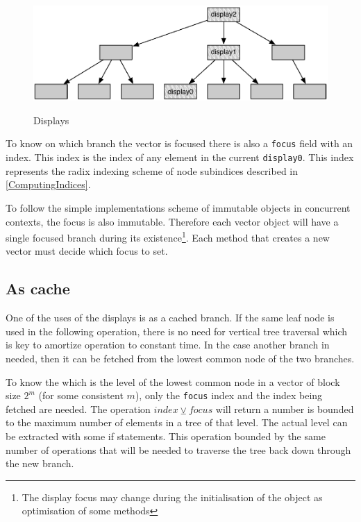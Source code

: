 \begin{figure}[h!]
  \centering
  \includegraphics[width=\textwidth]{Figures/Displays}
  \label{Displays}
  \caption{Displays}
\end{figure}

To know on which branch the vector is focused there is also a \texttt{focus} field with an index. This index is the index of any element in the current \texttt{display0}. This index represents the radix indexing scheme of node subindices described in \ref{ComputingIndices}.

To follow the simple implementations scheme of immutable objects in concurrent contexts, the focus is also immutable. Therefore each vector object will have a single focused branch during its existence\footnote{The display focus may change during the initialisation of the object as optimisation of some methods}. Each method that creates a new vector must decide which focus to set. 


\subsection{As cache}
One of the uses of the displays is as a cached branch. If the same leaf node is used in the following operation, there is no need for vertical tree traversal which is key to amortize operation to constant time. In the case another branch in needed, then it can be fetched from the lowest common node of the two branches. 

To know the which is the level of the lowest common node in a vector of block size $2^m$ (for some consistent $m$), only the \texttt{focus} index and the index being fetched are needed. The operation $index \veebar focus$ will return a number is bounded to the maximum number of elements in a tree of that level. The actual level can be extracted with some if statements. This operation bounded by the same number of operations that will be needed to traverse the tree back down through the new branch.

